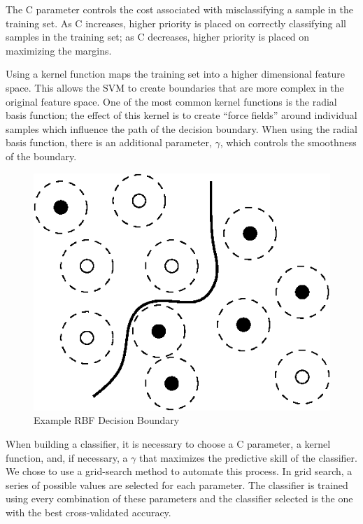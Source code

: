 \documentclass[12pt]{article}
\begin{document}
The C parameter controls the cost associated with misclassifying a sample in the training set. As C increases, higher priority is placed on correctly classifying all samples in the training set; as C decreases, higher priority is placed on maximizing the margins.

Using a kernel function maps the training set into a higher dimensional feature space. This allows the SVM to create boundaries that are more complex in the original feature space. One of the most common kernel functions is the radial basis function; the effect of this kernel is to create “force fields” around individual samples which influence the path of the decision boundary. When using the radial basis function, there is an additional parameter, \(\gamma\), which controls the smoothness of the boundary.

\begin{figure}[h]
  \centering
  \includegraphics[scale=1]{rbf}
  \caption{Example RBF Decision Boundary}
  \label{fig:RBF}
\end{figure}

When building a classifier, it is necessary to choose a C parameter, a kernel function, and, if necessary, a \(\gamma\) that maximizes the predictive skill of the classifier. We chose to use a grid-search method to automate this process. In grid search, a series of possible values are selected for each parameter. The classifier is trained using every combination of these parameters and the classifier selected is the one with the best cross-validated accuracy. 
\end{document}
